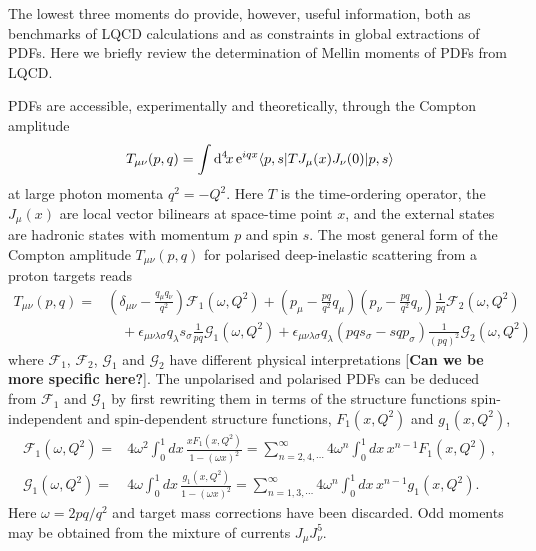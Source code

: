 The lowest three moments do provide, however, useful information, both as benchmarks of LQCD calculations and as constraints in global extractions of PDFs. Here we briefly review the determination of Mellin moments of PDFs from LQCD. 

PDFs are accessible, experimentally and theoretically, through the Compton amplitude
\begin{equation}
T_{\mu\nu}(p,q) = \int {\rm d}^4\!x\, {\rm e}^{iqx}  \langle p,s |T J_\mu(x) J_\nu(0)|p,s\rangle   
\end{equation}
at large photon momenta $q^2=-Q^2$. Here $T$ is the time-ordering operator, the $J_\mu(x)$ are local vector bilinears at space-time point $x$, and the external states are hadronic states with momentum $p$ and spin $s$. The most general form of the Compton amplitude $T_{\mu\nu}(p,q)$ for polarised deep-inelastic scattering from a proton targets reads
\begin{align}
T_{\mu\nu}(p,q) = {} & \left(\delta_{\mu\nu}-\frac{q_\mu q_\nu}{q^2}\right) \mathcal{F}_1(\omega,Q^2) + \left(p_\mu-\frac{pq}{q^2}q_\mu\right) \left(p_\nu-\frac{pq}{q^2}q_\nu\right) \frac{1}{pq} \mathcal{F}_2(\omega,Q^2)\\ 
& {} \quad  + \epsilon_{\mu\nu\lambda\sigma}q_\lambda s_\sigma \frac{1}{pq}\mathcal{G}_1(\omega,Q^2) + \epsilon_{\mu\nu\lambda\sigma}q_\lambda \left(pq s_\sigma - sq p_\sigma\right) \frac{1}{(pq)^2}\mathcal{G}_2(\omega,Q^2)
\end{align}
where $\mathcal{F}_1$, $\mathcal{F}_2$, $\mathcal{G}_1$ and $\mathcal{G}_2$ have different physical interpretations [\textbf{Can we be more specific here?}]. The unpolarised and polarised PDFs can be deduced from $\mathcal{F}_1$ and $\mathcal{G}_1$ by first rewriting them in terms of the structure functions spin-independent and spin-dependent structure functions, $F_1(x,Q^2)$ and $g_1(x,Q^2)$,
\begin{align}
\mathcal{F}_1(\omega,Q^2) = {} & 4 \omega^2 \int_0^1 dx\,  \frac{xF_1(x,Q^2)}{1-(\omega x)^2} = \sum_{n=2,4,\cdots}^\infty 4\omega^n \int_0^1 dx\, x^{n-1} F_1(x,Q^2) \,, \\
\mathcal{G}_1(\omega,Q^2) = {} & 4 \omega \int_0^1 dx\, \frac{g_1(x,Q^2)}{1-(\omega x)^2} = \sum_{n=1,3,\cdots}^\infty 4\omega^n \int_0^1 dx\, x^{n-1} g_1(x,Q^2).
\end{align}
Here $\omega=2pq/q^2$ and target mass corrections have been discarded. Odd moments may be obtained from the mixture of currents $J_\mu J_\nu^5$.

